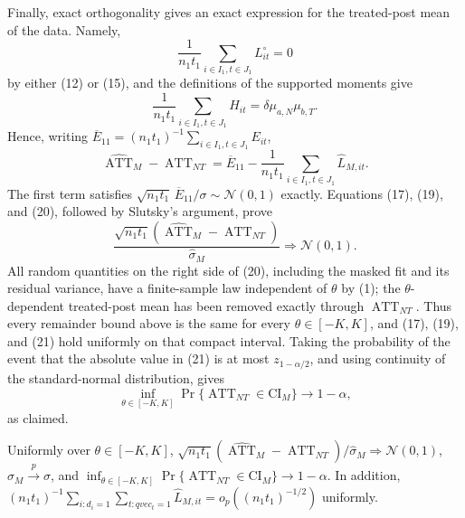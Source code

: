 Finally, exact orthogonality gives an exact expression for the treated-post mean of the data.  Namely,
\[
 \frac1{n_1t_1}\sum_{i\in I_1,t\in J_1}L^\circ_{it}=0
\]
by either (12) or (15), and the definitions of the supported moments give
\[
 \frac1{n_1t_1}\sum_{i\in I_1,t\in J_1}H_{it}
 =\delta\mu_{a,N}\mu_{b,T}.
\]
Hence, writing \(\overline E_{11}=(n_1t_1)^{-1}\sum_{i\in I_1,t\in J_1}E_{it}\),
\[
 \widehat{\operatorname{ATT}}_M-\operatorname{ATT}_{NT}
 =\overline E_{11}
 -\frac1{n_1t_1}\sum_{i\in I_1,t\in J_1}\widehat L_{M,it}.
\tag{20}
\]
The first term satisfies \(\sqrt{n_1t_1}\,\overline E_{11}/\sigma\sim\mathcal N(0,1)\) exactly.  Equations (17), (19), and (20), followed by Slutsky's argument, prove
\[
 \frac{\sqrt{n_1t_1}(\widehat{\operatorname{ATT}}_M-\operatorname{ATT}_{NT})}{\widehat\sigma_M}
 \Rightarrow\mathcal N(0,1).
\tag{21}
\]
All random quantities on the right side of (20), including the masked fit and its residual variance, have a finite-sample law independent of \(\theta\) by (1); the \(\theta\)-dependent treated-post mean has been removed exactly through \(\operatorname{ATT}_{NT}\).  Thus every remainder bound above is the same for every \(\theta\in[-K,K]\), and (17), (19), and (21) hold uniformly on that compact interval.  Taking the probability of the event that the absolute value in (21) is at most \(z_{1-\alpha/2}\), and using continuity of the standard-normal distribution, gives
\[
 \inf_{\theta\in[-K,K]}
 \Pr\{\operatorname{ATT}_{NT}\in\mathrm{CI}_M\}\longrightarrow1-\alpha,
\]
as claimed.

Uniformly over \(\theta\in[-K,K]\), \(\sqrt{n_1t_1}(\widehat{\operatorname{ATT}}_M-\operatorname{ATT}_{NT})/\widehat\sigma_M\Rightarrow\mathcal N(0,1)\), \(\widehat\sigma_M\xrightarrow{p}\sigma\), and \(\inf_{\theta\in[-K,K]}\Pr\{\operatorname{ATT}_{NT}\in\mathrm{CI}_M\}\to1-\alpha\). In addition, \((n_1t_1)^{-1}\sum_{i:d_i=1}\sum_{t:qvec_t=1}\widehat L_{M,it}=o_p((n_1t_1)^{-1/2})\) uniformly.
